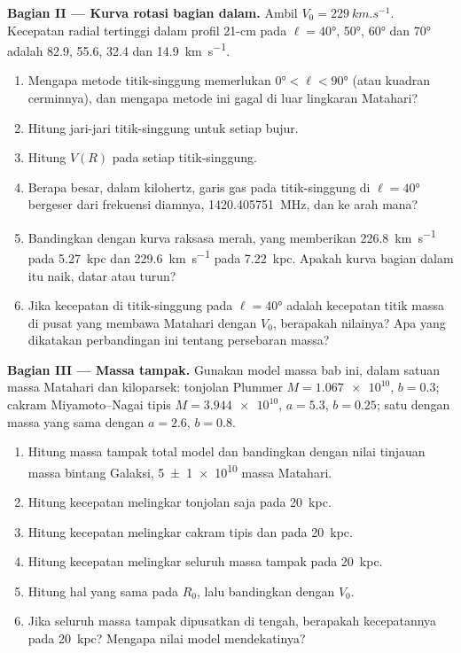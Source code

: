 \begin{problem}
\medskip\noindent\textbf{Bagian II --- Kurva rotasi bagian dalam.} Ambil
$V_0 = \qty{229}{km.s^{-1}}$. Kecepatan radial tertinggi dalam
profil 21-cm pada $\ell = \ang{40}$, \ang{50}, \ang{60} dan \ang{70} adalah
82.9, 55.6, 32.4 dan \qty{14.9}{km.s^{-1}}.
\begin{enumerate}[resume]
\item Mengapa metode titik-singgung memerlukan $\ang{0} < \ell < \ang{90}$
  (atau kuadran cerminnya), dan mengapa metode ini gagal di luar lingkaran Matahari?
\item Hitung jari-jari titik-singgung untuk setiap bujur.
\item Hitung $V(R)$ pada setiap titik-singgung.
\item Berapa besar, dalam kilohertz, garis gas pada titik-singgung di
  $\ell = \ang{40}$ bergeser dari frekuensi diamnya,
  \qty{1420.405751}{MHz}, dan ke arah mana?
\item Bandingkan dengan kurva raksasa merah, yang memberikan \qty{226.8}{km.s^{-1}}
  pada \qty{5.27}{kpc} dan \qty{229.6}{km.s^{-1}} pada \qty{7.22}{kpc}. Apakah
  kurva bagian dalam itu naik, datar atau turun?
\item Jika kecepatan di titik-singgung pada $\ell = \ang{40}$ adalah kecepatan
  titik massa di pusat yang membawa Matahari dengan $V_0$, berapakah nilainya?
  Apa yang dikatakan perbandingan ini tentang persebaran massa?
\end{enumerate}

\medskip\noindent\textbf{Bagian III --- Massa tampak.} Gunakan model massa
bab ini, dalam satuan massa Matahari dan kiloparsek: tonjolan Plummer
$M = \num{1.067e10}$, $b = 0.3$; cakram Miyamoto--Nagai tipis
$M = \num{3.944e10}$, $a = 5.3$, $b = 0.25$; satu  dengan
massa yang sama dengan $a = 2.6$, $b = 0.8$.
\begin{enumerate}[resume]
\item Hitung massa tampak total model dan bandingkan dengan nilai tinjauan
  massa bintang Galaksi, \qty[separate-uncertainty=true]{5 \pm 1 e10}{}
  massa Matahari.
\item Hitung kecepatan melingkar tonjolan saja pada \qty{20}{kpc}.
\item Hitung kecepatan melingkar cakram tipis dan  pada \qty{20}{kpc}.
\item Hitung kecepatan melingkar seluruh massa tampak pada
  \qty{20}{kpc}.
\item Hitung hal yang sama pada $R_0$, lalu bandingkan dengan $V_0$.
\item Jika seluruh massa tampak dipusatkan di tengah, berapakah kecepatannya
  pada \qty{20}{kpc}? Mengapa nilai model mendekatinya?
\end{enumerate}


\end{problem}
